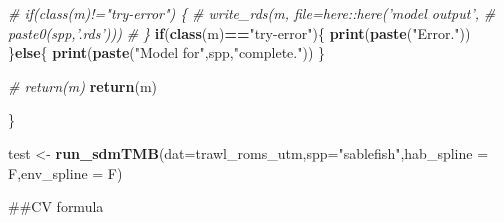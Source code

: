 \documentclass[
]{article}
\newenvironment{Shaded}{\begin{snugshade}}{\end{snugshade}}
\newcommand{\CommentTok}[1]{\textcolor[rgb]{0.56,0.35,0.01}{\textit{#1}}}
\newcommand{\ControlFlowTok}[1]{\textcolor[rgb]{0.13,0.29,0.53}{\textbf{#1}}}
\newcommand{\DataTypeTok}[1]{\textcolor[rgb]{0.13,0.29,0.53}{#1}}
\newcommand{\KeywordTok}[1]{\textcolor[rgb]{0.13,0.29,0.53}{\textbf{#1}}}
\newcommand{\NormalTok}[1]{#1}
\newcommand{\OperatorTok}[1]{\textcolor[rgb]{0.81,0.36,0.00}{\textbf{#1}}}
\newcommand{\StringTok}[1]{\textcolor[rgb]{0.31,0.60,0.02}{#1}}
\begin{document}
\begin{Shaded}
\begin{Highlighting}[]
  \CommentTok{# if(class(m)!="try-error") \{}
  \CommentTok{#   write_rds(m, file=here::here('model output',}
  \CommentTok{#                                paste0(spp,'.rds')))}
  \CommentTok{# \}}
  \ControlFlowTok{if}\NormalTok{(}\KeywordTok{class}\NormalTok{(m)}\OperatorTok{==}\StringTok{"try-error"}\NormalTok{)\{}
    \KeywordTok{print}\NormalTok{(}\KeywordTok{paste}\NormalTok{(}\StringTok{"Error."}\NormalTok{))}
\NormalTok{  \}}\ControlFlowTok{else}\NormalTok{\{}
    \KeywordTok{print}\NormalTok{(}\KeywordTok{paste}\NormalTok{(}\StringTok{"Model for"}\NormalTok{,spp,}\StringTok{"complete."}\NormalTok{))}
\NormalTok{  \}}

  \CommentTok{# return(m)}
  \KeywordTok{return}\NormalTok{(m)}

\NormalTok{\}}
\end{Highlighting}
\end{Shaded}

\begin{Shaded}
\begin{Highlighting}[]
\NormalTok{test <-}\StringTok{ }\KeywordTok{run_sdmTMB}\NormalTok{(}\DataTypeTok{dat=}\NormalTok{trawl_roms_utm,}\DataTypeTok{spp=}\StringTok{"sablefish"}\NormalTok{,}\DataTypeTok{hab_spline =}\NormalTok{ F,}\DataTypeTok{env_spline =}\NormalTok{ F)}
\end{Highlighting}
\end{Shaded}

\#\#CV formula
\end{document}
